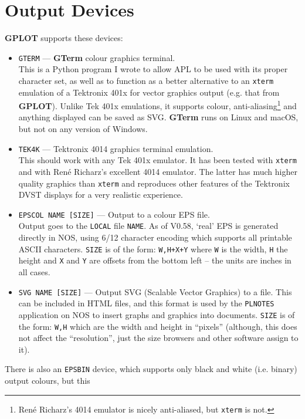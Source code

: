 \documentclass[a4paper,twoside,11pt]{article}
\newcommand{\newpara}{\par\vspace{4mm}\noindent}
\newcommand{\textttc}[1]{\texttt{\textcolor{OurRed}{#1}}}
\begin{document}
\section{Output Devices}\label{devinfolabel}
\textbf{GPLOT} supports these devices:
\begin{itemize}
\item \textttc{GTERM} --- \textbf{GTerm} colour graphics terminal.\\
   This is a Python program I wrote to allow APL to be used with its proper character set, as
   well as to function as a better alternative to an \texttt{xterm} emulation of a Tektronix 401x for
   vector graphics output (e.g. that from \textbf{GPLOT}). Unlike Tek 401x emulations, it supports colour,
   anti-aliasing\footnote{Ren\'{e} Richarz's 4014 emulator is nicely anti-aliased, but \texttt{xterm} is not.} 
   and anything displayed can be saved as SVG. \textbf{GTerm} runs on Linux and macOS, but not
   on any version of Windows.
\item \textttc{TEK4K} --- Tektronix 4014 graphics terminal emulation.\\
   This should work with any Tek 401x emulator. It has been tested with \texttt{xterm} and with Ren\'{e} Richarz's
   excellent 4014 emulator. The latter has much higher quality graphics than \texttt{xterm}
   and reproduces other features of the Tektronix
   DVST displays for a very realistic experience.
\item \textttc{EPSCOL NAME [SIZE]} --- Output to a colour EPS file.\\
   Output goes to the \texttt{LOCAL} file \texttt{NAME}. As of V0.58,
   `real' EPS is generated directly in NOS, using 6/12 character encoding which supports all printable ASCII
   characters. \texttt{SIZE} is of the form: \texttt{W,H+X+Y} where \texttt{W} is the width,
   \texttt{H} the height and \texttt{X} and \texttt{Y} are offsets from the bottom left -- the
   units are inches in all cases.
\item \textttc{SVG NAME [SIZE]} --- Output SVG (Scalable Vector Graphics) to a file. This can be included in HTML files, and
  this format is used by the \texttt{PLNOTES} application on NOS to insert graphs and graphics into documents.
  \texttt{SIZE} is of the form: \texttt{W,H} which are
  the width and height in ``pixels'' (although, this does not affect the ``resolution'', just
  the size browsers and other software assign to it).
\end{itemize}
\newpara
There is also an \textttc{EPSBIN} device, which supports only black and white (i.e. binary) output colours, but this
\end{document}
